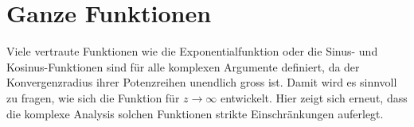 %
%
%
\section{Ganze Funktionen
\label{buch:analytisch:section:ganz}}
Viele vertraute Funktionen wie die Exponentialfunktion oder die Sinus-
und Kosinus-Funktionen sind für alle komplexen Argumente definiert,
da der Konvergenzradius ihrer Potenzreihen unendlich gross ist.
Damit wird es sinnvoll zu fragen, wie sich die Funktion für $z\to\infty$ 
entwickelt.
Hier zeigt sich erneut, dass die komplexe Analysis solchen Funktionen
strikte Einschränkungen auferlegt.




